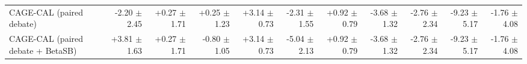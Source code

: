 \begin{tabular}{lrrrrrrrrrr}
CAGE-CAL (paired debate) & -2.20 {\scriptsize $\pm$ 2.45} & +0.27 {\scriptsize $\pm$ 1.71} & +0.25 {\scriptsize $\pm$ 1.23} & +3.14 {\scriptsize $\pm$ 0.73} & -2.31 {\scriptsize $\pm$ 1.55} & +0.92 {\scriptsize $\pm$ 0.79} & -3.68 {\scriptsize $\pm$ 1.32} & -2.76 {\scriptsize $\pm$ 2.34} & -9.23 {\scriptsize $\pm$ 5.17} & -1.76 {\scriptsize $\pm$ 4.08} \\
CAGE-CAL (paired debate + BetaSB) & +3.81 {\scriptsize $\pm$ 1.63} & +0.27 {\scriptsize $\pm$ 1.71} & -0.80 {\scriptsize $\pm$ 1.05} & +3.14 {\scriptsize $\pm$ 0.73} & -5.04 {\scriptsize $\pm$ 2.13} & +0.92 {\scriptsize $\pm$ 0.79} & -3.68 {\scriptsize $\pm$ 1.32} & -2.76 {\scriptsize $\pm$ 2.34} & -9.23 {\scriptsize $\pm$ 5.17} & -1.76 {\scriptsize $\pm$ 4.08} \\
\bottomrule
\end{tabular}
